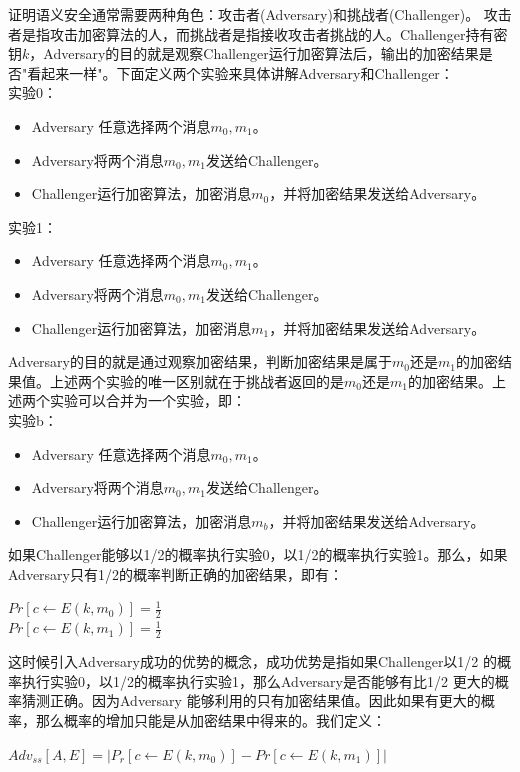 证明语义安全通常需要两种角色：攻击者(Adversary)和挑战者(Challenger)。 攻击者是指攻击加密算法的人，而挑战者是指接收攻击者挑战的人。Challenger持有密钥$k$，Adversary的目的就是观察Challenger运行加密算法后，输出的加密结果是否"看起来一样"。下面定义两个实验来具体讲解Adversary和Challenger：\\
实验0：
\begin{itemize}
    \item Adversary 任意选择两个消息$m_0,m_1$。
    \item Adversary将两个消息$m_0,m_1$发送给Challenger。
    \item Challenger运行加密算法，加密消息$m_0$，并将加密结果发送给Adversary。
\end{itemize}
实验1：
\begin{itemize}
    \item Adversary 任意选择两个消息$m_0,m_1$。
    \item Adversary将两个消息$m_0,m_1$发送给Challenger。
    \item Challenger运行加密算法，加密消息$m_1$，并将加密结果发送给Adversary。
\end{itemize}
Adversary的目的就是通过观察加密结果，判断加密结果是属于$m_0$还是$m_1$的加密结果值。上述两个实验的唯一区别就在于挑战者返回的是$m_0$还是$m_1$的加密结果。上述两个实验可以合并为一个实验，即：\\
实验b：
\begin{itemize}
    \item Adversary 任意选择两个消息$m_0,m_1$。
    \item Adversary将两个消息$m_0,m_1$发送给Challenger。
    \item Challenger运行加密算法，加密消息$m_b$，并将加密结果发送给Adversary。
\end{itemize}
如果Challenger能够以1/2的概率执行实验0，以1/2的概率执行实验1。那么，如果Adversary只有1/2的概率判断正确的加密结果，即有：
\begin{center}
    $Pr[c \leftarrow E(k,m_0)]=\frac{1}{2}$\\
    $Pr[c \leftarrow E(k,m_1)]=\frac{1}{2}$
\end{center}
这时候引入Adversary成功的优势的概念，成功优势是指如果Challenger以1/2 的概率执行实验0，以1/2的概率执行实验1，那么Adversary是否能够有比1/2 更大的概率猜测正确。因为Adversary 能够利用的只有加密结果值。因此如果有更大的概率，那么概率的增加只能是从加密结果中得来的。我们定义：
\begin{center}
    $Adv_{ss}[A,E]=|P_r[c \leftarrow E(k,m_0)]-Pr[c \leftarrow E(k,m_1)]|$
\end{center}
